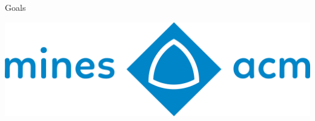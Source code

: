 \documentclass[final]{beamer}
\newlength{\onecolwid}
\begin{document}
\begin{frame}[t]
\begin{columns}[t]
\begin{column}{\onecolwid}
\begin{block}{Goals}
\begin{itemize}
                    \end{itemize}

                \end{block}
		\includegraphics[width=.95\linewidth]{full_2048.png}

            \end{column} %

        \end{columns} %

    \end{frame} %
\end{document}
